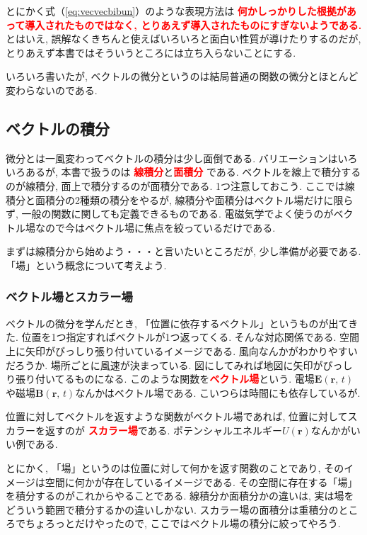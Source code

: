 とにかく式（\ref{eq:vecvecbibun}）のような表現方法は
\textbf{\textcolor{red}{何かしっかりした根拠があって導入されたものではなく, とりあえず導入されたものにすぎないようである.}}
とはいえ, 誤解なくきちんと使えばいろいろと面白い性質が導けたりするのだが, とりあえず本書ではそういうところには立ち入らないことにする. 

いろいろ書いたが, ベクトルの微分というのは結局普通の関数の微分とほとんど変わらないのである. 

\subsection{ベクトルの積分}
微分とは一風変わってベクトルの積分は少し面倒である. バリエーションはいろいろあるが, 本書で扱うのは
\textbf{\textcolor{red}{線積分}}と\textbf{\textcolor{red}{面積分}}
である. ベクトルを線上で積分するのが線積分, 面上で積分するのが面積分である. 
1つ注意しておこう. ここでは線積分と面積分の2種類の積分をやるが, 
線積分や面積分はベクトル場だけに限らず, 一般の関数に関しても定義できるものである. 
電磁気学でよく使うのがベクトル場なので今はベクトル場に焦点を絞っているだけである. 

まずは線積分から始めよう・・・と言いたいところだが, 少し準備が必要である. 「場」という概念について考えよう. 

\subsubsection{ベクトル場とスカラー場}
ベクトルの微分を学んだとき, 「位置に依存するベクトル」というものが出てきた. 位置を1つ指定すればベクトルが1つ返ってくる. 
そんな対応関係である. 空間上に矢印がびっしり張り付いているイメージである. 
風向なんかがわかりやすいだろうか. 場所ごとに風速が決まっている. 図にしてみれば地図に矢印がびっしり張り付いてるものになる. 
このような関数を\textbf{\textcolor{red}{ベクトル場}}という. 
電場$\bm{E}(\bm{r}, \, t)$や磁場$\bm{B}(\bm{r}, \, t)$なんかはベクトル場である. こいつらは時間にも依存しているが. 

位置に対してベクトルを返すような関数がベクトル場であれば, 位置に対してスカラーを返すのが
\textbf{\textcolor{red}{スカラー場}}である. 
ポテンシャルエネルギー$U(\bm{r})$なんかがいい例である. 

とにかく, 「場」というのは位置に対して何かを返す関数のことであり, そのイメージは空間に何かが存在しているイメージである. 
その空間に存在する「場」を積分するのがこれからやることである. 
線積分か面積分かの違いは, 実は場をどういう範囲で積分するかの違いしかない. 
スカラー場の面積分は重積分のところでちょろっとだけやったので, ここではベクトル場の積分に絞ってやろう. 
